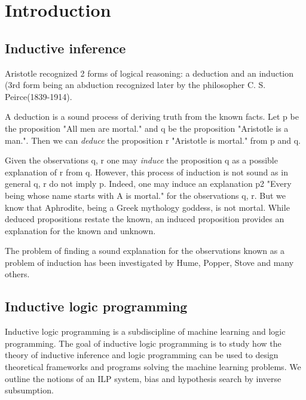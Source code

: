 
\chapter{Introduction}


\section{Inductive inference}
Aristotle recognized 2 forms of logical reasoning: a deduction and an induction\cite{sep-aristotle-logic} (3rd form being an abduction recognized later by the philosopher C. S. Peirce(1839-1914)\cite{kimber2012learning}\cite{peirce1935collected}.

A deduction is a sound process of deriving truth from the known facts. Let p be the proposition "All men are mortal." and q be the proposition "Aristotle is a man.". Then we can \emph{deduce} the proposition r "Aristotle is mortal." from p and q.

Given the observations q, r one may \emph{induce} the proposition q as a possible explanation of r from q. However, this process of induction is not sound as in general q, r do not imply p. Indeed, one may induce an explanation p2 "Every being whose name starts with A is mortal." for the observations q, r. But we know that Aphrodite, being a Greek mythology goddess, is not mortal. While  deduced propositions restate the known, an induced proposition provides an explanation for the known and unknown.

The problem of finding a sound explanation for the observations known as a problem of induction has been investigated by Hume\cite{hume1902enquiries}\cite{selby1888treatise}, Popper\cite{keuth2013karl}, Stove\cite{stove1986rationality} and many others.

\section{Inductive logic programming}\cite{muggleton1995inverse}\cite{nienhuys1997foundations}
Inductive logic programming is a subdiscipline of machine learning and logic programming. The goal of inductive logic programming is to study how the theory of inductive inference and logic programming can be used to design theoretical frameworks and programs solving the machine learning problems. We outline the notions of an ILP system, bias and hypothesis search by inverse subsumption.

